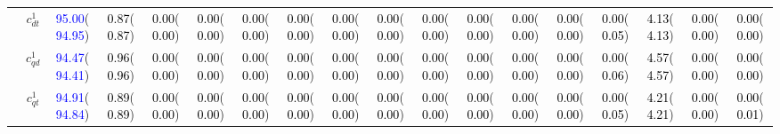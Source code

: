 \documentclass{article}
\begin{document}
\begin{landscape}
\begin{table}[H]
\begin{tabular}{|c|c|c|c|c|c|c|c|c|c|c|c|c|c|c|c|c|c|}
 & $c_{dt}^{1}$ & \textcolor{blue}{95.00}(\textcolor{blue}{94.95}) & \textcolor{black}{0.87}(\textcolor{black}{0.87}) & \textcolor{black}{0.00}(\textcolor{black}{0.00}) & \textcolor{black}{0.00}(\textcolor{black}{0.00}) & \textcolor{black}{0.00}(\textcolor{black}{0.00}) & \textcolor{black}{0.00}(\textcolor{black}{0.00}) & \textcolor{black}{0.00}(\textcolor{black}{0.00}) & \textcolor{black}{0.00}(\textcolor{black}{0.00}) & \textcolor{black}{0.00}(\textcolor{black}{0.00}) & \textcolor{black}{0.00}(\textcolor{black}{0.00}) & \textcolor{black}{0.00}(\textcolor{black}{0.00}) & \textcolor{black}{0.00}(\textcolor{black}{0.00}) & \textcolor{black}{0.00}(\textcolor{black}{0.05}) & \textcolor{black}{4.13}(\textcolor{black}{4.13}) & \textcolor{black}{0.00}(\textcolor{black}{0.00}) & \textcolor{black}{0.00}(\textcolor{black}{0.00})\\ \cline{2-18}
 & $c_{qd}^{1}$ & \textcolor{blue}{94.47}(\textcolor{blue}{94.41}) & \textcolor{black}{0.96}(\textcolor{black}{0.96}) & \textcolor{black}{0.00}(\textcolor{black}{0.00}) & \textcolor{black}{0.00}(\textcolor{black}{0.00}) & \textcolor{black}{0.00}(\textcolor{black}{0.00}) & \textcolor{black}{0.00}(\textcolor{black}{0.00}) & \textcolor{black}{0.00}(\textcolor{black}{0.00}) & \textcolor{black}{0.00}(\textcolor{black}{0.00}) & \textcolor{black}{0.00}(\textcolor{black}{0.00}) & \textcolor{black}{0.00}(\textcolor{black}{0.00}) & \textcolor{black}{0.00}(\textcolor{black}{0.00}) & \textcolor{black}{0.00}(\textcolor{black}{0.00}) & \textcolor{black}{0.00}(\textcolor{black}{0.06}) & \textcolor{black}{4.57}(\textcolor{black}{4.57}) & \textcolor{black}{0.00}(\textcolor{black}{0.00}) & \textcolor{black}{0.00}(\textcolor{black}{0.00})\\ \cline{2-18}
 & $c_{qt}^{1}$ & \textcolor{blue}{94.91}(\textcolor{blue}{94.84}) & \textcolor{black}{0.89}(\textcolor{black}{0.89}) & \textcolor{black}{0.00}(\textcolor{black}{0.00}) & \textcolor{black}{0.00}(\textcolor{black}{0.00}) & \textcolor{black}{0.00}(\textcolor{black}{0.00}) & \textcolor{black}{0.00}(\textcolor{black}{0.00}) & \textcolor{black}{0.00}(\textcolor{black}{0.00}) & \textcolor{black}{0.00}(\textcolor{black}{0.00}) & \textcolor{black}{0.00}(\textcolor{black}{0.00}) & \textcolor{black}{0.00}(\textcolor{black}{0.00}) & \textcolor{black}{0.00}(\textcolor{black}{0.00}) & \textcolor{black}{0.00}(\textcolor{black}{0.00}) & \textcolor{black}{0.00}(\textcolor{black}{0.05}) & \textcolor{black}{4.21}(\textcolor{black}{4.21}) & \textcolor{black}{0.00}(\textcolor{black}{0.00}) & \textcolor{black}{0.00}(\textcolor{black}{0.01})\\ \cline{2-18}

\end{tabular}
\end{table}
\end{landscape}
\end{document}
